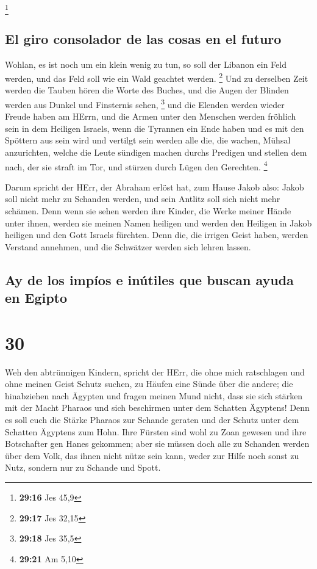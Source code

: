 \footnote{\textbf{29:16} Jes 45,9}

\hypertarget{el-giro-consolador-de-las-cosas-en-el-futuro}{%
\subsection{El giro consolador de las cosas en el
futuro}\label{el-giro-consolador-de-las-cosas-en-el-futuro}}

 Wohlan, es ist noch um ein klein wenig zu tun, so soll
der Libanon ein Feld werden, und das Feld soll wie ein Wald geachtet
werden. \footnote{\textbf{29:17} Jes 32,15}  Und zu
derselben Zeit werden die Tauben hören die Worte des Buches, und die
Augen der Blinden werden aus Dunkel und Finsternis sehen, \footnote{\textbf{29:18}
  Jes 35,5}  und die Elenden werden wieder Freude haben
am HErrn, und die Armen unter den Menschen werden fröhlich sein in dem
Heiligen Israels,  wenn die Tyrannen ein Ende haben und
es mit den Spöttern aus sein wird und vertilgt sein werden alle die, die
wachen, Mühsal anzurichten,  welche die Leute sündigen
machen durchs Predigen und stellen dem nach, der sie straft im Tor, und
stürzen durch Lügen den Gerechten. \footnote{\textbf{29:21} Am 5,10}

 Darum spricht der HErr, der Abraham erlöst hat, zum
Hause Jakob also: Jakob soll nicht mehr zu Schanden werden, und sein
Antlitz soll sich nicht mehr schämen.  Denn wenn sie
sehen werden ihre Kinder, die Werke meiner Hände unter ihnen, werden sie
meinen Namen heiligen und werden den Heiligen in Jakob heiligen und den
Gott Israels fürchten.  Denn die, die irrigen Geist
haben, werden Verstand annehmen, und die Schwätzer werden sich lehren
lassen.

\hypertarget{ay-de-los-impuxedos-e-inuxfatiles-que-buscan-ayuda-en-egipto}{%
\subsection{Ay de los impíos e inútiles que buscan ayuda en
Egipto}\label{ay-de-los-impuxedos-e-inuxfatiles-que-buscan-ayuda-en-egipto}}

\hypertarget{section-29}{%
\section{30}\label{section-29}}

 Weh den abtrünnigen Kindern, spricht der HErr, die ohne
mich ratschlagen und ohne meinen Geist Schutz suchen, zu Häufen eine
Sünde über die andere;  die hinabziehen nach Ägypten und
fragen meinen Mund nicht, dass sie sich stärken mit der Macht Pharaos
und sich beschirmen unter dem Schatten Ägyptens!  Denn es
soll euch die Stärke Pharaos zur Schande geraten und der Schutz unter
dem Schatten Ägyptens zum Hohn.  Ihre Fürsten sind wohl zu
Zoan gewesen und ihre Botschafter gen Hanes gekommen; 
aber sie müssen doch alle zu Schanden werden über dem Volk, das ihnen
nicht nütze sein kann, weder zur Hilfe noch sonst zu Nutz, sondern nur
zu Schande und Spott.

